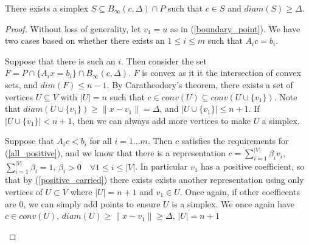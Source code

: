 \documentclass{article}
\let\oldref\ref
\renewcommand{\ref}[1]{(\oldref{#1})}
\begin{document}
\begin{lemma}
\label{there_is_a_big_simplex}
There exists a simplex $S \subseteq B_{\infty}(c, \Delta) \cap P$ such that $c \in S$ and $diam(S) \ge \Delta$.
\end{lemma}
\begin{proof}
Without loss of generality, let $v_1 = u$ as in \ref{boundary_point}.
We have two cases based on whether there exists an $1\le i \le m$ such that $A_i c = b_i$.

\begin{case}
Suppose that there is such an $i$.
Then consider the set $F = P \cap \{A_i x = b_i\} \cap B_{\infty}(c, \Delta)$.
$F$ is convex as it it the intersection of convex sets, and $dim(F) \le n - 1$.
By Caratheodory's theorem, there exists a set of vertices $U \subseteq V$ with $|U| = n$ such that $c \in conv(U) \subseteq conv(U \cup \{v_1\})$.
Note that $diam(U\cup \{v_1\}) \ge \|x-v_1\| = \Delta$, and $|U\cup \{v_1\}| \le n+1$.
If $|U\cup \{v_1\}| < n+1$, then we can always add more vertices to make $U$ a simplex.
\end{case}
\begin{case}
Suppose that $A_i c < b_i$ for all $i=1\ldots m$.
Then $c$ satisfies the requirements for \ref{all_positive}, and we know that there is a representation 
$c = \sum_{i=1}^{|V|} \beta_i v_i$, $\sum_{i=1}^{|V|} \beta_i =1$,
$\beta_i > 0 \quad \forall 1\le i \le |V|$.
In particular $v_1$ has a positive coefficient, so that by \ref{positive_carried} there exists exists another representation using only vertices of $U\subset V$ where $|U| = n+1$ and $v_1 \in U$.
Once again, if other coefficents are $0$, we can simply add points to ensure $U$ is a simplex.
We once again have $c \in conv(U)$, $diam(U) \ge \|x-v_1\| \ge \Delta$, $|U| = n+1$
\end{case}
\end{proof}
\end{document}
